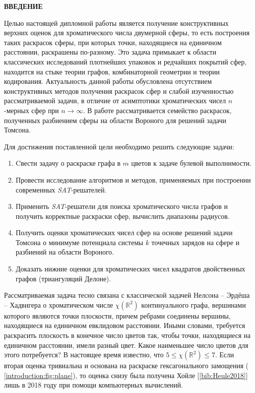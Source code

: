 \newpage
\begin{center}
\noindent\textbf{ВВЕДЕНИЕ}\label{chapters:introduction}
\vspace{1.5mm}
\end{center}

Целью настоящей дипломной работы является получение конструктивных верхних оценок для хроматического числа двумерной сферы, 
то есть построения таких раскрасок сферы, при которых точки, находящиеся на единичном расстоянии, раскрашены по-разному. 
Это задача примыкает к области классических исследований плотнейших упаковок и редчайших покрытий сфер, находится на стыке
теории графов, комбинаторной геометрии и теории кодирования.
Актуальность данной работы обусловлена отсутствием конструктивных методов получения раскрасок сфер и слабой изученностью рассматриваемой задачи, в отличие от асимптотики хроматических чисел $n$-мерных сфер при $n\to\infty$. 
В работе рассматривается семейство раскрасок, полученных разбиением сферы на области Вороного для решений задачи Томсона.

Для достижения поставленной цели необходимо решить следующие задачи:

\begin{enumerate}

\item Cвести задачу о раскраске графа в $m$ цветов к задаче булевой выполнимости.
\item Провести исследование алгоритмов и методов, применяемых при построении современных \textit{SAT}-решателей.
\item Применить \textit{SAT}-решатели для поиска хроматического числа графов и получить корректные раскраски сфер, вычислить диапазоны радиусов.
\item Получить оценки хроматических чисел сфер на основе решений задачи Томсона о минимуме потенциала системы $k$ точечных зарядов на сфере и разбиений на области Вороного.
\item Доказать нижние оценки для хроматических чисел квадратов двойственных графов (триангуляций Делоне).

\end{enumerate}

Рассматриваемая задача тесно связана с классической задачей Нелсона -- Эрдёша -- Хадвигера о хроматическом числе $\chi(\mathbb{R}^2)$ континуального графа, вершинами которого являются точки плоскости, причем ребрами соединены вершины, находящиеся на единичном евклидовом расстоянии. Иными словами, требуется раскрасить плоскость в конечное число цветов так, чтобы точки, находящиеся на единичном расстоянии, имели разный цвет. Какое наименьшее число цветов для этого потребуется? В настоящее время известно, что $5 \leq \chi(\mathbb{R}^2) \leq 7$. Если вторая оценка тривиальна и основана на раскраске гексагонального замощения (\figurename{ \ref{introduction:fig:plane}}), то оценка снизу была получена Хойле [\ref{bib:Heule2018}] лишь в 2018 году при помощи компьютерных вычислений. 

